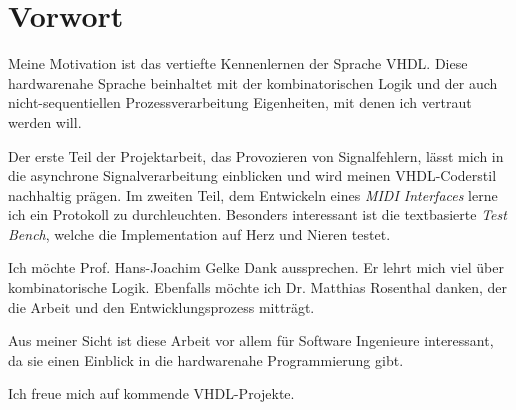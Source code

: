 
\chapter*{Vorwort}\label{chap.vorwort}

Meine Motivation ist das vertiefte Kennenlernen der Sprache VHDL. Diese hardwarenahe Sprache beinhaltet mit der kombinatorischen Logik und der auch nicht-sequentiellen Prozessverarbeitung Eigenheiten, mit denen ich vertraut werden will. 

Der erste Teil der Projektarbeit, das Provozieren von Signalfehlern, lässt mich in die asynchrone Signalverarbeitung einblicken und wird meinen VHDL-Coderstil nachhaltig prägen. Im zweiten Teil, dem Entwickeln eines \textit{MIDI Interfaces} lerne ich ein Protokoll zu durchleuchten. Besonders interessant ist die textbasierte \textit{Test Bench}, welche die Implementation auf Herz und Nieren testet.

Ich möchte Prof. Hans-Joachim Gelke Dank aussprechen. Er lehrt mich viel über kombinatorische Logik. Ebenfalls möchte ich Dr. Matthias Rosenthal danken, der die Arbeit und den Entwicklungsprozess mitträgt.

Aus meiner Sicht ist diese Arbeit vor allem für Software Ingenieure interessant, da sie einen  Einblick in die hardwarenahe Programmierung gibt.

Ich freue mich auf kommende VHDL-Projekte.
